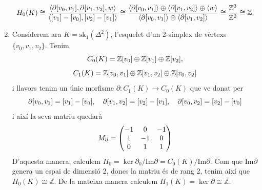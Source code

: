 \documentclass[../main.tex]{subfiles}
\begin{document}
\begin{ej}
\begin{enumerate}[(1)]
    \begin{equation}
        \notag
        H_0(K)\cong \frac{\langle \partial[v_0,v_1],\partial[v_1,v_2],w\rangle}{\langle [v_1]-[v_0], [v_2]-[v_1]\rangle}\cong\frac{\langle \partial[v_0,v_1]\rangle\oplus\langle\partial[v_1,v_2]\rangle\oplus\langle w\rangle}{\langle \partial[v_0,v_1]\rangle\oplus\langle\partial[v_1,v_2]\rangle}\cong \frac{\mathbb{Z}^3}{\mathbb{Z}^2}\cong\mathbb{Z}.
    \end{equation}
    
    \item Considerem ara $K = \mathrm{sk}_1(\Delta^2)$, l'esquelet d'un 2-símplex de vèrtexs $\{v_0,v_1,v_2\}$. Tenim
    \begin{equation}
        \notag
        C_0(K) = \mathbb{Z}[v_0]\oplus\mathbb{Z}[v_1]\oplus\mathbb{Z}[v_2],
    \end{equation}
    \begin{equation}
        \notag
        C_1(K) = \mathbb{Z}[v_0,v_1]\oplus\mathbb{Z}[v_1,v_2]\oplus\mathbb{Z}[v_0,v_2]
    \end{equation}
    i llavors tenim un únic morfisme $\partial:C_1(K)\rightarrow C_0(K)$ que ve donat per
    \begin{equation}
        \notag
        \partial[v_0,v_1] = [v_1]-[v_0],\quad\partial[v_1,v_2] = [v_2]-[v_1],\quad\partial[v_0,v_2] = [v_2]-[v_0]
    \end{equation}
    i així la seva matriu quedarà
    \begin{equation}
        \notag
        M_\partial = 
        \begin{pmatrix}
            -1 & 0 & -1 \\
            1 & -1 & 0 \\
            0 & 1 & 1
        \end{pmatrix}
    \end{equation}
    D'aquesta manera, calculem $H_0 = \ker\partial_0/\mathrm{Im}\partial = C_0(K)/\mathrm{Im}\partial$. Com que $\mathrm{Im}\partial$ genera un espai de dimensió 2, doncs la matriu és de rang 2, tenim així que $H_0(K)\cong \mathbb{Z}$. De la mateixa manera calculem $H_1(K) = \ker \partial \cong \mathbb{Z}$.
    

\end{enumerate}
\end{ej}
\end{document}
